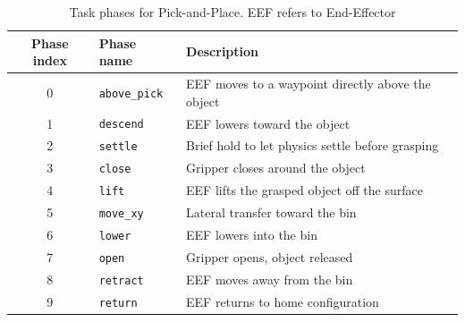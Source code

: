 \documentclass{article}
\begin{document}
\begin{table}[htbp]
    \centering
    \caption{Task phases for Pick-and-Place. EEF refers to End-Effector}
    \label{tab:phases_pp}
    \small
    \begin{tabular}{clp{8cm}}
        \toprule
        Phase index & Phase name           & Description                                       \\
        \midrule
        0           & \texttt{above\_pick} & EEF moves to a waypoint directly above the object \\
        1           & \texttt{descend}     & EEF lowers toward the object                      \\
        2           & \texttt{settle}      & Brief hold to let physics settle before grasping  \\
        3           & \texttt{close}       & Gripper closes around the object                  \\
        4           & \texttt{lift}        & EEF lifts the grasped object off the surface      \\
        5           & \texttt{move\_xy}    & Lateral transfer toward the bin                   \\
        6           & \texttt{lower}       & EEF lowers into the bin                           \\
        7           & \texttt{open}        & Gripper opens, object released                    \\
        8           & \texttt{retract}     & EEF moves away from the bin                       \\
        9           & \texttt{return}      & EEF returns to home configuration                 \\
        \bottomrule
    \end{tabular}
\end{table}
\end{document}
